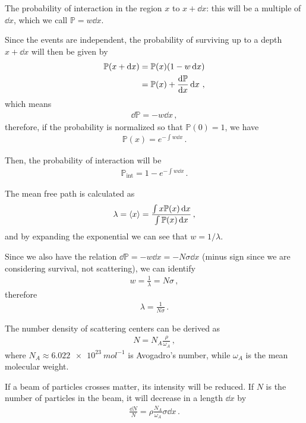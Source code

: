 \documentclass[main.tex]{subfiles}
\begin{document}
The probability of interaction in the region \(x\) to \(x + \dd{x}\): this will be a multiple of \(\dd{x}\), which we call \(\mathbb{P} =  w \dd{x}\).

Since the events are independent,
the probability of surviving up to a depth \(x + \dd{x}\) will then be given by 
%
\begin{align}
\mathbb{P} (x + \dd{x}) &= 
\mathbb{P} (x) (1 - w \dd{x})  \\
&= \mathbb{P} (x) + \dv{\mathbb{P} }{x} \dd{x}
\,,
\end{align}
%
which means 
%
\begin{align}
\dd{\mathbb{P}} = - w \dd{x}
\,,
\end{align}
%
therefore, if the probability is normalized so that \(\mathbb{P}(0) =1\), we have 
%
\begin{align}
\mathbb{P}(x) =  e^{- \int w \dd{x}}
\,.
\end{align}

Then, the probability of interaction will be 
%
\begin{align}
\mathbb{P} _{\text{int}} = 1 - e^{- \int w \dd{x}}
\,.
\end{align}

The mean free path is calculated as 
%
\begin{align}
\lambda  = \expval{x} = \frac{\int x \mathbb{P} (x) \dd{x}}{\int \mathbb{P} (x) \dd{x}}
\,,
\end{align}
%
and by expanding the exponential we can see that \(w = 1 / \lambda \). 

Since we also have the relation \(\dd{\mathbb{P} } = - w \dd{x} = -N \sigma \dd{x}\) (minus sign since we are considering survival, not scattering), we can identify 
%
\begin{align}
w = \frac{1}{\lambda } = N \sigma 
\,,
\end{align}
%
therefore 
%
\begin{align}
\lambda = \frac{1}{N \sigma }
\,.
\end{align}

The number density of scattering centers can be derived as 
%
\begin{align}
N = N_A \frac{\rho }{\omega_{A}}
\,,
\end{align}
%
where \(N_A \approx \SI{6.022e23}{mol^{-1}}\) is Avogadro's number, while \(\omega_{A}\) is the mean molecular weight.

If a beam of particles crosses matter, its intensity will be reduced. If \(N\) is the number of particles in the beam, it will decrease in a length \(\dd{x}\) by 
%
\begin{align}
\frac{\dd{N}}{N} = \rho \frac{N_A}{\omega_{A}} \sigma \dd{x}  
\,.
\end{align}
\end{document}
